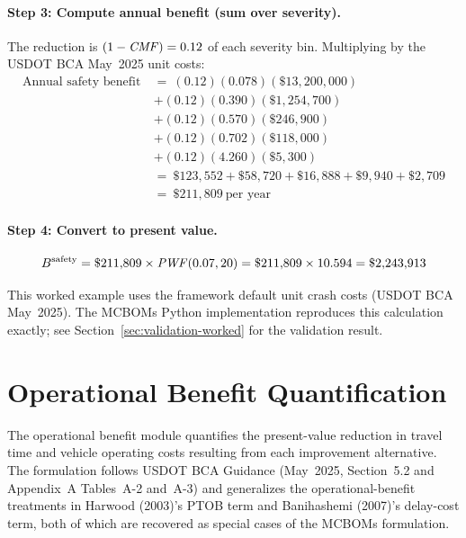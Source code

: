 \paragraph{Step 3: Compute annual benefit (sum over severity).}
The reduction is $(1 - \mathit{CMF}) = 0.12$ of each severity bin. Multiplying by the
USDOT BCA May~2025 unit costs:
\begin{align*}
\text{Annual safety benefit} \ &=\ (0.12)(0.078)(\$13{,}200{,}000) \\
&+ (0.12)(0.390)(\$1{,}254{,}700) \\
&+ (0.12)(0.570)(\$246{,}900) \\
&+ (0.12)(0.702)(\$118{,}000) \\
&+ (0.12)(4.260)(\$5{,}300) \\
&=\ \$123{,}552 + \$58{,}720 + \$16{,}888 + \$9{,}940 + \$2{,}709 \\
&=\ \$211{,}809 \ \text{per year}
\end{align*}

\paragraph{Step 4: Convert to present value.}
\begin{equation*}
B^{\mathrm{safety}} = \$211{,}809 \times \mathit{PWF}(0.07, 20) = \$211{,}809 \times 10.594 = \$2{,}243{,}913
\end{equation*}

This worked example uses the framework default unit crash costs (USDOT BCA
May~2025). The MCBOMs Python implementation reproduces this calculation
exactly; see Section~\ref{sec:validation-worked} for the validation result.

\section{Operational Benefit Quantification}
\label{sec:ops}

The operational benefit module quantifies the present-value reduction in
travel time and vehicle operating costs resulting from each improvement
alternative. The formulation follows USDOT BCA Guidance (May~2025,
Section~5.2 and Appendix~A Tables~A-2 and~A-3) and generalizes the
operational-benefit treatments in Harwood (2003)'s PTOB term and
Banihashemi (2007)'s delay-cost term, both of which are recovered as special
cases of the MCBOMs formulation.

